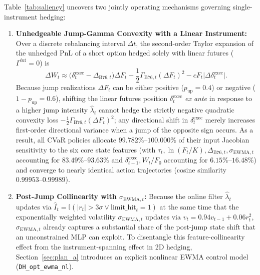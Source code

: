 \documentclass[11pt,a4paper]{article}
\begin{document}
Table~\ref{tab:saliency} uncovers two jointly operating mechanisms governing single-instrument hedging:
\begin{enumerate}
  \item \textbf{Unhedgeable Jump-Gamma Convexity with a Linear Instrument:} Over a discrete rebalancing interval $\Delta t$, the second-order Taylor expansion of the unhedged PnL of a short option hedged solely with linear futures ($\Gamma^{\text{fut}} = 0$) is
  \begin{equation}
    \Delta W_t \approx \big(\delta_t^{\text{exec}} - \Delta_{\text{B76},t}\big)\Delta F_t - \frac{1}{2}\Gamma_{\text{B76},t}(\Delta F_t)^2 - c F_t\big|\Delta \delta_t^{\text{exec}}\big|.
    \label{eq:taylor_gamma}
  \end{equation}
  Because jump realizations $\Delta F_t$ can be either positive ($p_{\text{up}} = 0.4$) or negative ($1 - p_{\text{up}} = 0.6$), shifting the linear futures position $\delta_t^{\text{exec}}$ \emph{ex ante} in response to a higher jump intensity $\hat{\lambda}_t$ cannot hedge the strictly negative quadratic convexity loss $-\frac{1}{2}\Gamma_{\text{B76},t}(\Delta F_t)^2$; any directional shift in $\delta_t^{\text{exec}}$ merely increases first-order directional variance when a jump of the opposite sign occurs. As a result, all CVaR policies allocate $99.782\%\text{--}100.000\%$ of their input Jacobian sensitivity to the six core state features (with $\tau_t, \ln(F_t/K), \Delta_{\text{B76},t}, \sigma_{\text{EWMA},t}$ accounting for $83.49\%\text{--}93.63\%$ and $\delta_{t-1}^{\text{exec}}, W_t/F_0$ accounting for $6.15\%\text{--}16.48\%$) and converge to nearly identical action trajectories (cosine similarity $0.99953\text{--}0.99989$).
  \item \textbf{Post-Jump Collinearity with $\sigma_{\text{EWMA},t}$:} Because the online filter $\hat{\lambda}_t$ updates via $\hat{I}_t = \mathbb{I}(|r_t| > 3\sigma \lor \text{limit\_hit}_t = 1)$ at the same time that the exponentially weighted volatility $\sigma_{\text{EWMA},t}$ updates via $v_t = 0.94 v_{t-1} + 0.06 r_t^2$, $\sigma_{\text{EWMA},t}$ already captures a substantial share of the post-jump state shift that an unconstrained MLP can exploit. To disentangle this feature-collinearity effect from the instrument-spanning effect in 2D hedging, Section~\ref{sec:plan_a} introduces an explicit nonlinear EWMA control model (\texttt{DH\_opt\_ewma\_nl}).
\end{enumerate}
\end{document}

